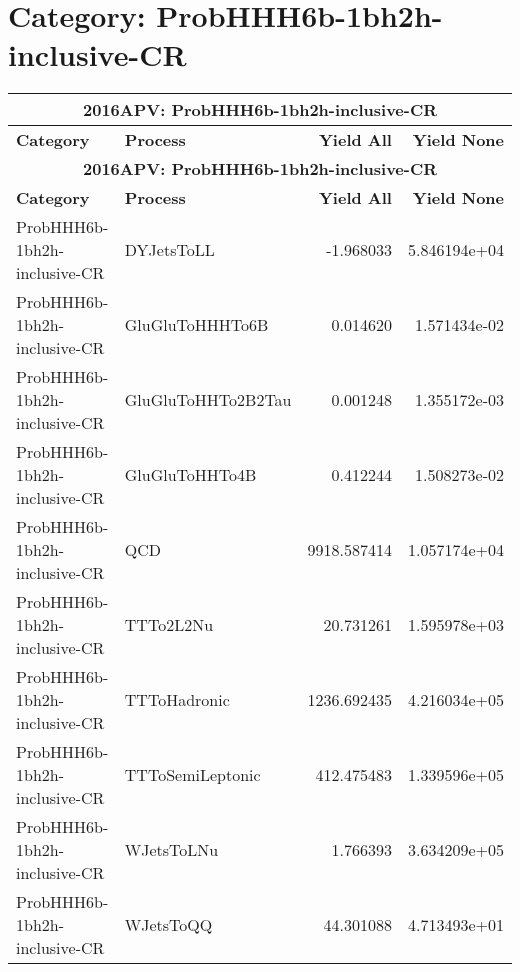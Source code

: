 \documentclass{article}
\begin{document}
\section*{Category: ProbHHH6b-1bh2h-inclusive-CR}
\begin{longtable}[c]{|l|l|r|r|}
\hline
\multicolumn{4}{|c|}{\textbf{2016APV: ProbHHH6b-1bh2h-inclusive-CR}} \\
\hline
\textbf{Category} & \textbf{Process} & \textbf{Yield All} & \textbf{Yield None} \\
\hline
\endfirsthead
\hline
\multicolumn{4}{|c|}{\textbf{2016APV: ProbHHH6b-1bh2h-inclusive-CR}} \\
\hline
\textbf{Category} & \textbf{Process} & \textbf{Yield All} & \textbf{Yield None} \\
\hline
\endhead
ProbHHH6b-1bh2h-inclusive-CR & DYJetsToLL & -1.968033 & 5.846194e+04 \\
\hline
ProbHHH6b-1bh2h-inclusive-CR & GluGluToHHHTo6B & 0.014620 & 1.571434e-02 \\
\hline
ProbHHH6b-1bh2h-inclusive-CR & GluGluToHHTo2B2Tau & 0.001248 & 1.355172e-03 \\
\hline
ProbHHH6b-1bh2h-inclusive-CR & GluGluToHHTo4B & 0.412244 & 1.508273e-02 \\
\hline
ProbHHH6b-1bh2h-inclusive-CR & QCD & 9918.587414 & 1.057174e+04 \\
\hline
ProbHHH6b-1bh2h-inclusive-CR & TTTo2L2Nu & 20.731261 & 1.595978e+03 \\
\hline
ProbHHH6b-1bh2h-inclusive-CR & TTToHadronic & 1236.692435 & 4.216034e+05 \\
\hline
ProbHHH6b-1bh2h-inclusive-CR & TTToSemiLeptonic & 412.475483 & 1.339596e+05 \\
\hline
ProbHHH6b-1bh2h-inclusive-CR & WJetsToLNu & 1.766393 & 3.634209e+05 \\
\hline
ProbHHH6b-1bh2h-inclusive-CR & WJetsToQQ & 44.301088 & 4.713493e+01 \\
\hline
\end{longtable}
\end{document}
